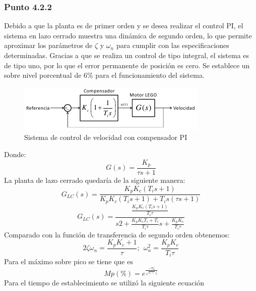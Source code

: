 \documentclass[twocolumn]{IEEEtran}
\begin{document}
\subsubsection{Punto 4.2.2}
\noindent
Debido a que la planta es de primer orden y se desea realizar el control PI, el sistema en lazo cerrado muestra una dinámica de segundo orden, lo que permite aproximar los parámetros de $\zeta$ y $\omega _n$ para cumplir con las especificaciones determinadas. Gracias a que se realiza un control de tipo integral, el sistema es de tipo uno, por lo que el error permanente de posición es cero.
Se establece un sobre nivel porcentual de 6\% para el funcionamiento del sistema.
\begin{figure}[H]
	\centering
		\includegraphics[scale=1]{tf2.png}
	\caption{Sistema de control de velocidad con compensador PI}
	\label{fig2}
\end{figure}
\noindent
Donde:
\begin{equation}
 G\left( s \right) = \frac{{K_p }}{{\tau s + 1}}
\label{ecu100}
\end{equation}
\noindent
La planta de lazo cerrado quedaría de la siguiente manera:
\begin{equation}
 G_{LC} \left( s \right) = \frac{{K_p K_c \left( {T_i s + 1} \right)}}{{K_p K_c \left( {T_i s + 1} \right) + T_i s\left( {\tau s + 1} \right)}}
\label{ecu1}
\end{equation}
\begin{equation}
 G_{LC} \left( s \right) = \frac{{\frac{{K_p K_c \left( {T_i s + 1} \right)}}{{T_i \tau }}}}{{s2 + \frac{{K_p K_c T_i  + T_i }}{{T_i \tau }}s + \frac{{K_p K_c }}{{T_i \tau }}}}
\label{ecu2}
\end{equation}
\noindent
Comparado con la función de transferencia de segundo orden obtenemos:
\begin{equation}
 2\zeta \omega _n  = \frac{{K_p K_c  + 1}}{\tau } ;\ \ \omega _n ^2  = \frac{{K_p K_c }}{{T_i \tau }}
\label{ecu3}
\end{equation}
\noindent
Para el máximo sobre pico se tiene que es
\begin{equation}
 Mp\left( \%  \right) = e^{\frac{{ - \pi \zeta }}{{\sqrt {1 - } \zeta }}} 
\label{ecu5}
\end{equation}
\noindent
Para el tiempo de establecimiento se utilizó la siguiente ecuación
\end{document}
